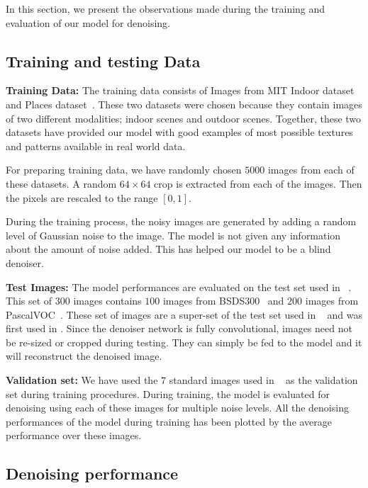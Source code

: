 \documentclass[10pt,twocolumn,letterpaper]{proc}
\begin{document}
In this section, we present the observations made during the training and evaluation of our model for denoising.

\subsection{Training and testing Data}

\textbf{Training Data:}
The training data consists of Images from MIT Indoor dataset~\cite{quattoni2009recognizing} and Places dataset~\cite{zhou2014learning}.
These two datasets were chosen because they contain images of two different modalities; indoor scenes and outdoor scenes. Together, these two datasets have provided our model with good examples of most possible textures and patterns available in real world data.

For preparing training data, we have randomly chosen $5000$ images from each of these datasets. A random $64\times64$ crop is extracted from each of the images. Then the pixels are rescaled to the range $[0,1]$. 

During the training process, the noisy images are generated by adding a random level of Gaussian noise to the image. The model is not given any information about the amount of noise added. This has helped our model to be a blind denoiser.


\textbf{Test Images:}
The model performances are evaluated on the test set used in ~\cite{Vemulapalli_2016_CVPR}. This set of $300$ images contains $100$ images from BSDS300~\cite{MartinFTM01} and $200$ images from PascalVOC~\cite{pascal-voc-2011}. These set of images are a super-set of the test set used in ~\cite{roth2005fields,schmidt2014shrinkage,zoran2011learning} and was first used in \cite{Vemulapalli_2016_CVPR}. Since the denoiser network is fully convolutional, images need not be re-sized or cropped during testing. They can simply be fed to the model and it will reconstruct the denoised image.


\textbf{Validation set:}
We have used the $7$ standard images used in ~\cite{portilla2003image} as the validation set during training procedures. 
During training, the model is evaluated for denoising using each of these images for multiple noise levels. All the denoising performances of the model during training has been plotted by the average performance over these images.


\subsection{Denoising performance}\label{sec:results}
\end{document}
